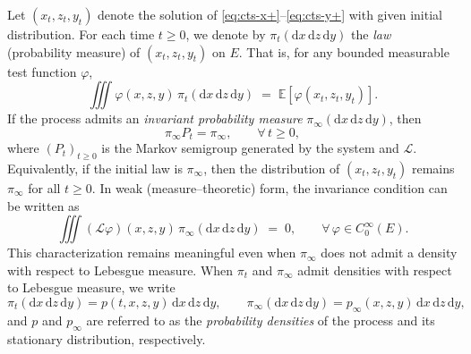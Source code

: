 \documentclass[11pt, a4paper,leqno]{amsart}
\theoremstyle{definition}
\numberwithin{equation}{section}
\begin{document}
Let $(x_t,z_t,y_t)$ denote the solution of
\eqref{eq:cts-x+}–\eqref{eq:cts-y+} with given initial distribution.
For each time $t \ge 0$, we denote by $\pi_t(\mathrm{d}x\,\mathrm{d}z\,\mathrm{d}y)$
the \emph{law} (probability measure) of $(x_t,z_t,y_t)$ on
$E$. That is, for any bounded measurable test function $\varphi$,
\[
\iiint \varphi(x,z,y)\,\pi_t(\mathrm{d}x\,\mathrm{d}z\,\mathrm{d}y)
\;=\;
\mathbb{E}[\varphi(x_t,z_t,y_t)].
\]
If the process admits an \emph{invariant probability measure}
$\pi_\infty(\mathrm{d}x\,\mathrm{d}z\,\mathrm{d}y)$, then
\[
\pi_\infty P_t = \pi_\infty, \qquad \forall\,t\ge0,
\]
where $(P_t)_{t\ge0}$ is the Markov semigroup generated by the system and $\mathcal{L}$.
Equivalently, if the initial law is $\pi_\infty$, then the distribution of
$(x_t,z_t,y_t)$ remains $\pi_\infty$ for all $t\ge0$. In weak (measure–theoretic) form, the invariance condition can be written as
\begin{equation}\label{weak-inv-measure}
\iiint ({\mathcal{L}}\varphi)(x,z,y)\,
\pi_\infty(\mathrm{d}x\,\mathrm{d}z\,\mathrm{d}y)
\;=\;0,
\qquad
\forall\,\varphi\in C_0^\infty(E).
\end{equation}
This characterization remains meaningful even when $\pi_\infty$ does not admit a density
with respect to Lebesgue measure. When $\pi_t$ and $\pi_\infty$ admit densities with respect to
Lebesgue measure, we write
\[
\pi_t(\mathrm{d}x\,\mathrm{d}z\,\mathrm{d}y)
= p(t,x,z,y)\,\mathrm{d}x\,\mathrm{d}z\,\mathrm{d}y,
\qquad
\pi_\infty(\mathrm{d}x\,\mathrm{d}z\,\mathrm{d}y)
= p_\infty(x,z,y)\,\mathrm{d}x\,\mathrm{d}z\,\mathrm{d}y,
\]
and $p$ and $p_\infty$ are referred to as the \emph{probability densities}
of the process and its stationary distribution, respectively.
\end{document}
